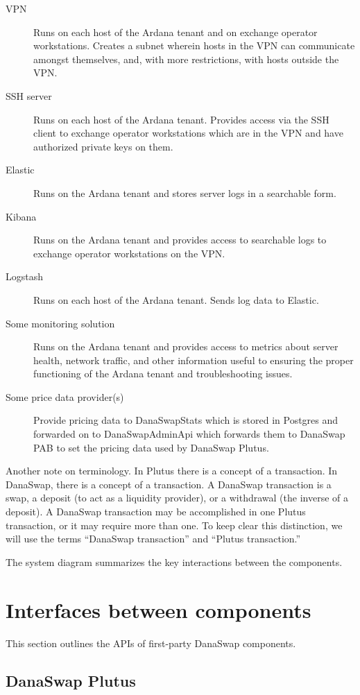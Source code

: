 \documentclass[12pt]{article}
\begin{document}
\begin{description}
	\item[VPN] Runs on each host of the Ardana tenant and on exchange operator workstations. Creates a subnet wherein hosts in the VPN can communicate amongst themselves, and, with more restrictions, with hosts outside the VPN.
	\item[SSH server] Runs on each host of the Ardana tenant. Provides access via the SSH client to exchange operator workstations which are in the VPN and have authorized private keys on them.
	\item[Elastic] Runs on the Ardana tenant and stores server logs in a searchable form.
	\item[Kibana] Runs on the Ardana tenant and provides access to searchable logs to exchange operator workstations on the VPN.
	\item[Logstash]	Runs on each host of the Ardana tenant. Sends log data to Elastic.
	\item[Some monitoring solution] Runs on the Ardana tenant and provides access to metrics about server health, network traffic, and other information useful to ensuring the proper functioning of the Ardana tenant and troubleshooting issues.
	\item[Some price data provider(s)] Provide pricing data to DanaSwapStats which is stored in Postgres and forwarded on to DanaSwapAdminApi which forwards them to DanaSwap PAB to set the pricing data used by DanaSwap Plutus.
\end{description}

Another note on terminology. In Plutus there is a concept of a transaction. In DanaSwap, there is a concept of a transaction. A DanaSwap transaction is a swap, a deposit (to act as a liquidity provider), or a withdrawal (the inverse of a deposit). A DanaSwap transaction may be accomplished in one Plutus transaction, or it may require more than one. To keep clear this distinction, we will use the terms ``DanaSwap transaction'' and ``Plutus transaction.''

The system diagram summarizes the key interactions between the components.


\section{Interfaces between components}

This section outlines the APIs of first-party DanaSwap components.

\subsection{DanaSwap Plutus}
\end{document}
